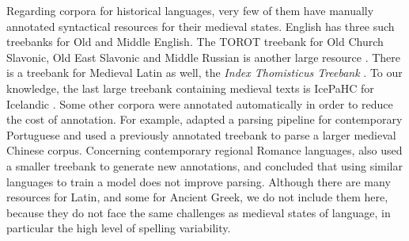 Regarding corpora for historical languages, very few of them have manually annotated syntactical resources for their medieval states. English has three such treebanks \citep{oxford-2001-the,kroch-etal-2000-the,traugott-pintzuk-2008-coding} for Old and Middle English. The TOROT treebank for Old Church Slavonic, Old East Slavonic and Middle Russian is another large resource \citep{berdicevskis-eckhoff-2020-diachronic}. There is a treebank for Medieval Latin as well, the \emph{Index Thomisticus Treebank} \citep{passarotti-2019-project}. To our knowledge, the last large treebank containing medieval texts is IcePaHC for Icelandic \citep{rognvaldsson-etal-2012-icelandic}. Some other corpora were annotated automatically in order to reduce the cost of annotation. For example, \citet{rocio-etal-2003-automated} adapted a parsing pipeline for contemporary Portuguese and \citet{lee-kong-2014-a} used a previously annotated treebank \citep{lee-kong-2012-dependency} to parse a larger medieval Chinese corpus. Concerning contemporary regional Romance languages, \citet{miletic-etal-2020-building} also used a smaller treebank to generate new annotations, and concluded that using similar languages to train a model does not improve parsing. Although there are many resources for Latin, and some for Ancient Greek, we do not include them here, because they do not face the same challenges as medieval states of language, in particular the high level of spelling variability.

